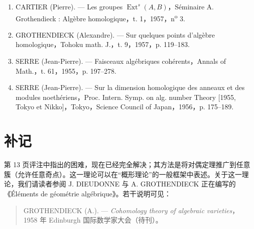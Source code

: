 \begin{enumerate}
\item[1.]\label{fga1-bib-1} CARTIER (Pierre). — Les groupes $\operatorname{Ext}^s(A,B)$，Séminaire A. Grothendieck : Algèbre homologique，t. 1，1957，n\textsuperscript{o} 3.
\item[2.]\label{fga1-bib-2} GROTHENDIECK (Alexandre). — Sur quelques points d’algèbre homologique，Tohoku math. J.，t. 9，1957，p. 119–183.
\item[3.]\label{fga1-bib-3} SERRE (Jean-Pierre). — Faisceaux algébriques cohérents，Annals of Math.，t. 61，1955，p. 197–278.
\item[4.]\label{fga1-bib-4} SERRE (Jean-Pierre). — Sur la dimension homologique des anneaux et des modules noethériens，Proc. Intern. Symp. on alg. number Theory [1955, Tokyo et Nikko]，Tokyo，Science Council of Japan，1956，p. 175–189.
\end{enumerate}\endgroup
\section*{补记}

第 13 页评注中指出的困难，现在已经完全解决；其方法是将对偶定理推广到任意簇（允许任意奇点）。这一理论可以在“概形理论”的一般框架中表述。关于这一理论，我们请读者参阅 J. DIEUDONNE 与 A. GROTHENDIECK 正在编写的《Éléments de géométrie algébrique》。若干说明可见：

\begin{quote}
GROTHENDIECK (A.). — \emph{Cohomology theory of algebraic varieties}，1958 年 Edinburgh 国际数学家大会（待刊）。
\end{quote}

\begin{flushright}
[1959 年 4 月]
\end{flushright}
